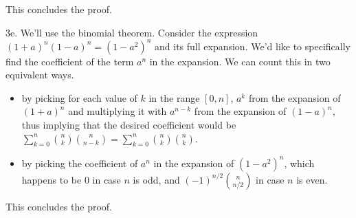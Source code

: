 \documentclass{article}
\begin{document}
This concludes the proof.

3e. We'll use the binomial theorem. Consider the expression $(1 + a)^n(1 - a)^n = (1 - a^2)^n$ and its full expansion. We'd like to specifically find the coefficient of the term $a^n$ in the expansion. We can count this in two equivalent ways.

\begin{itemize}
    \item by picking for each value of $k$ in the range $[0, n]$, $a^k$ from the expansion of $(1 + a)^n$ and multiplying it with $a^{n - k}$ from the expansion of $(1 - a)^n$, thus implying that the desired coefficient would be $\sum_{k=0}^n{n \choose k}{n \choose n - k} = \sum_{k=0}^n{n \choose k}{n \choose k}$.
    \item by picking the coefficient of $a^n$ in the expansion of $(1 - a^2)^n$, which happens to be $0$ in case $n$ is odd, and $(-1)^{n/2}{n \choose n / 2}$ in case $n$ is even.
\end{itemize}

This concludes the proof.
\end{document}
